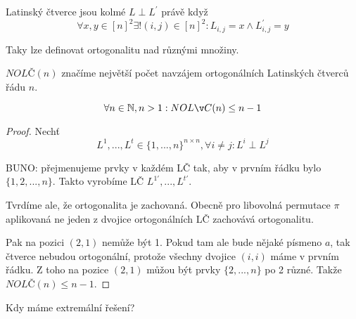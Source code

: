 \begin{definition}[Kolmost LČ]
	Latinský čtverce jsou kolmé $L \perp L^{\prime}$ právě když
	\[ \forall x,y \in [n]^2 \exists ! (i,j) \in [n]^2: L_{i,j} = x \land L_{i,j}^{\prime} = y \]

	Taky lze definovat ortogonalitu nad různými množiny.
\end{definition}

\begin{notation}[NOLČ(n)]
	$NOLČ(n)$ značíme největší počet navzájem ortogonálních Latinských čtverců řádu $n$.
\end{notation}

\begin{theorem}\label{nolc_lower0}
	\[\forall n \in \N, n > 1: NOLČ(n) \leq n - 1 \]
\end{theorem}
\begin{proof}
	Nechť
	\[L^1, ..., L^t \in \{ 1, ..., n \}^{n \times n}, \forall i \neq j: L^i \perp L^j \]

	BUNO: přejmenujeme prvky v každém LČ tak, aby v prvním řádku bylo $\{ 1, 2, ..., n \}$.
	Takto vyrobíme LČ $L^{1 \prime}, ..., L^{t \prime}$.

	Tvrdíme ale, že ortogonalita je zachovaná.
	Obecně pro libovolná permutace $\pi$ aplikovaná ne jeden z dvojice ortogonálních LČ zachovává ortogonalitu.

	Pak na pozici $(2,1)$ nemůže být 1.
	Pokud tam ale bude nějaké písmeno $a$, tak čtverce nebudou ortogonální, protože všechny dvojice $(i, i)$ máme v prvním řádku.
	Z toho na pozice $(2,1)$ můžou být prvky $\{ 2, ..., n \}$ po 2 různé.
	Takže $NOLČ(n) \leq n - 1 $.
\end{proof}

Kdy máme extremální řešení?

